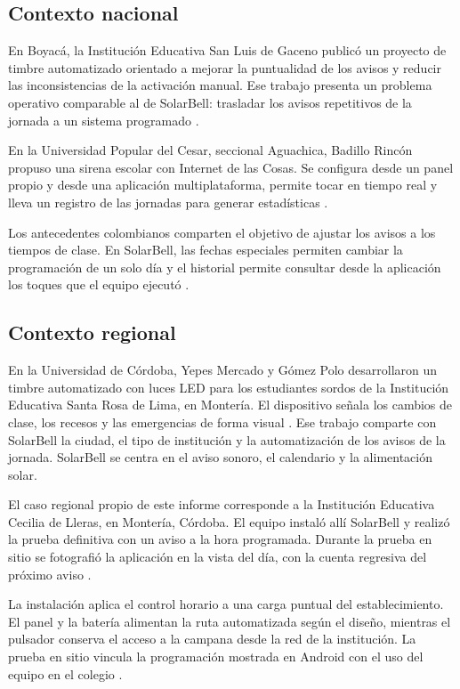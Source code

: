 \documentclass[a4paper,11pt]{article}
\begin{document}
\subsection{Contexto nacional}
En Boyacá, la Institución Educativa San Luis de Gaceno publicó un proyecto de timbre automatizado orientado a mejorar la puntualidad de los avisos y reducir las inconsistencias de la activación manual. Ese trabajo presenta un problema operativo comparable al de SolarBell: trasladar los avisos repetitivos de la jornada a un sistema programado \cite{gaceno}.

En la Universidad Popular del Cesar, seccional Aguachica, Badillo Rincón propuso una sirena escolar con Internet de las Cosas. Se configura desde un panel propio y desde una aplicación multiplataforma, permite tocar en tiempo real y lleva un registro de las jornadas para generar estadísticas \cite{badillo}.

Los antecedentes colombianos comparten el objetivo de ajustar los avisos a los tiempos de clase. En SolarBell, las fechas especiales permiten cambiar la programación de un solo día y el historial permite consultar desde la aplicación los toques que el equipo ejecutó \cite{ficha,repo}.

\subsection{Contexto regional}
En la Universidad de Córdoba, Yepes Mercado y Gómez Polo desarrollaron un timbre automatizado con luces LED para los estudiantes sordos de la Institución Educativa Santa Rosa de Lima, en Montería. El dispositivo señala los cambios de clase, los recesos y las emergencias de forma visual \cite{yepes}. Ese trabajo comparte con SolarBell la ciudad, el tipo de institución y la automatización de los avisos de la jornada. SolarBell se centra en el aviso sonoro, el calendario y la alimentación solar.

El caso regional propio de este informe corresponde a la Institución Educativa Cecilia de Lleras, en Montería, Córdoba. El equipo instaló allí SolarBell y realizó la prueba definitiva con un aviso a la hora programada. Durante la prueba en sitio se fotografió la aplicación en la vista del día, con la cuenta regresiva del próximo aviso \cite{evidencia}.

La instalación aplica el control horario a una carga puntual del establecimiento. El panel y la batería alimentan la ruta automatizada según el diseño, mientras el pulsador conserva el acceso a la campana desde la red de la institución. La prueba en sitio vincula la programación mostrada en Android con el uso del equipo en el colegio \cite{ficha,diagrama,evidencia}.
\end{document}
